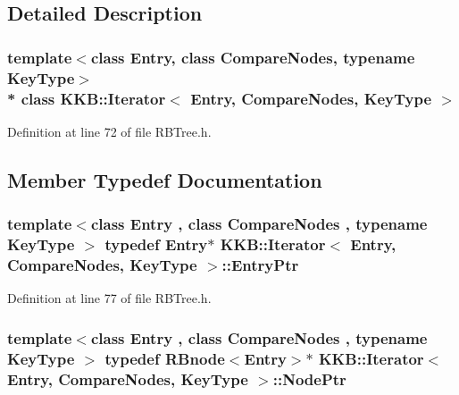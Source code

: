 \subsection{Detailed Description}
\subsubsection*{template$<$class Entry, class Compare\+Nodes, typename Key\+Type$>$\\*
class K\+K\+B\+::\+Iterator$<$ Entry, Compare\+Nodes, Key\+Type $>$}



Definition at line 72 of file R\+B\+Tree.\+h.



\subsection{Member Typedef Documentation}
\subsubsection[{\texorpdfstring{Entry\+Ptr}{EntryPtr}}]{\setlength{\rightskip}{0pt plus 5cm}template$<$class Entry , class Compare\+Nodes , typename Key\+Type $>$ typedef Entry$\ast$ {\bf K\+K\+B\+::\+Iterator}$<$ Entry, Compare\+Nodes, Key\+Type $>$\+::{\bf Entry\+Ptr}}\hypertarget{class_k_k_b_1_1_iterator_a5ef3b16d0bdf3de41ca114c2eebd6e1e}{}\label{class_k_k_b_1_1_iterator_a5ef3b16d0bdf3de41ca114c2eebd6e1e}


Definition at line 77 of file R\+B\+Tree.\+h.

\subsubsection[{\texorpdfstring{Node\+Ptr}{NodePtr}}]{\setlength{\rightskip}{0pt plus 5cm}template$<$class Entry , class Compare\+Nodes , typename Key\+Type $>$ typedef {\bf R\+Bnode}$<$Entry$>$$\ast$ {\bf K\+K\+B\+::\+Iterator}$<$ Entry, Compare\+Nodes, Key\+Type $>$\+::{\bf Node\+Ptr}}\hypertarget{class_k_k_b_1_1_iterator_aa840c0dd987e462281441126f7f36f19}{}\label{class_k_k_b_1_1_iterator_aa840c0dd987e462281441126f7f36f19}


